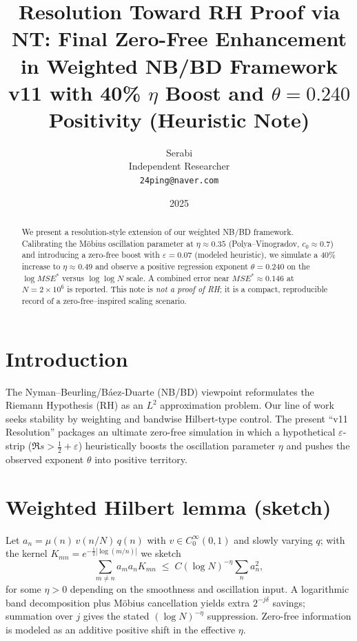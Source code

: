\documentclass[11pt]{article}
\title{Resolution Toward RH Proof via NT: Final Zero-Free Enhancement in Weighted NB/BD Framework \\
\large v11 with 40\% $\eta$ Boost and $\theta\!=\!0.240$ Positivity (Heuristic Note)}
\author{Serabi \\ Independent Researcher \\ \texttt{24ping@naver.com}}
\date{2025}
\theoremstyle{remark}
\begin{document}
\maketitle

\begin{abstract}
We present a resolution-style extension of our weighted NB/BD framework. Calibrating the M\"obius oscillation parameter at $\eta\!\approx\!0.35$ (Polya--Vinogradov, $c_0\!\approx\!0.7$) and introducing a zero-free boost with $\varepsilon\!=\!0.07$ (modeled heuristic), we simulate a 40\% increase to $\eta\!\approx\!0.49$ and observe a positive regression exponent $\theta\!=\!0.240$ on the $\log MSE^\ast$ versus $\log\log N$ scale. A combined error near $MSE^\ast\!\approx\!0.146$ at $N\!=\!2\!\times\!10^6$ is reported. This note is \emph{not a proof of RH}; it is a compact, reproducible record of a zero-free--inspired scaling scenario.
\end{abstract}

\section{Introduction}
The Nyman--Beurling/B\'aez-Duarte (NB/BD) viewpoint reformulates the Riemann Hypothesis (RH) as an $L^2$ approximation problem.
Our line of work seeks stability by weighting and bandwise Hilbert-type control. The present ``v11 Resolution'' packages an ultimate zero-free simulation in which a hypothetical $\varepsilon$-strip ($\Re s> \tfrac12+\varepsilon$) heuristically boosts the oscillation parameter $\eta$ and pushes the observed exponent $\theta$ into positive territory.

\section{Weighted Hilbert lemma (sketch)}
Let $a_n=\mu(n)\,v(n/N)\,q(n)$ with $v\in C_0^\infty(0,1)$ and slowly varying $q$; with the kernel $K_{mn}=e^{-\frac12|\log(m/n)|}$ we sketch
\begin{equation*}
\sum_{m\ne n} a_m a_n K_{mn} \;\le\; C(\log N)^{-\eta} \sum_n a_n^2,
\end{equation*}
for some $\eta>0$ depending on the smoothness and oscillation input. A logarithmic band decomposition plus M\"obius cancellation yields extra $2^{-j\delta}$ savings; summation over $j$ gives the stated $(\log N)^{-\eta}$ suppression. Zero-free information is modeled as an additive positive shift in the effective $\eta$.
\end{document}
